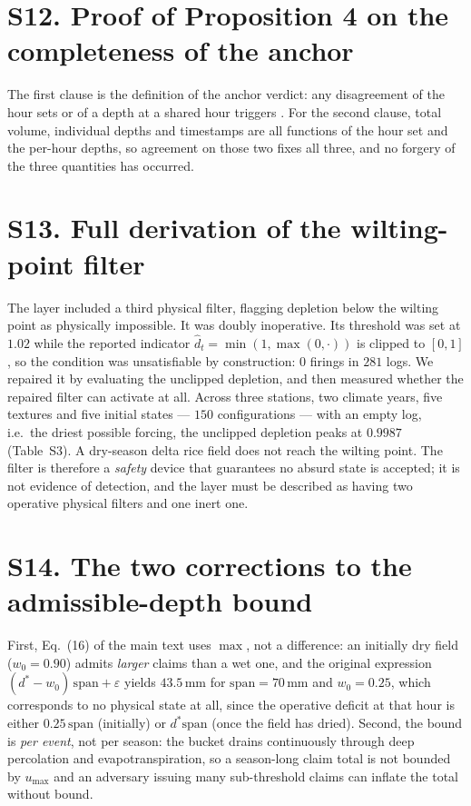 \section*{S12. Proof of Proposition 4 on the completeness of the anchor}

The first clause is the definition of the anchor verdict: any disagreement of
the hour sets or of a depth at a shared hour triggers . For the
second clause, total volume, individual depths and timestamps are all functions
of the hour set and the per-hour depths, so agreement on those two fixes all
three, and no forgery of the three quantities has occurred.

\section*{S13. Full derivation of the wilting-point filter}

The layer included a third physical filter, flagging depletion below the wilting point as physically impossible. It was doubly inoperative. Its
threshold was set at $1.02$ while the reported indicator
$\hat d_t=\min(1,\max(0,\cdot))$ is clipped to $[0,1]$, so the condition was
unsatisfiable by construction: $0$ firings in $281$ logs. We repaired it by
evaluating the unclipped depletion, and then measured whether the repaired filter
can activate at all. Across three stations, two climate years, five textures and
five initial states --- $150$ configurations --- with an empty log, i.e.\ the
driest possible forcing, the unclipped depletion peaks at $0.9987$
(Table~S3). A dry-season delta rice field does not reach the
wilting point. The filter is therefore a \emph{safety} device that guarantees no
absurd state is accepted; it is not evidence of detection, and the layer must be
described as having two operative physical filters and one inert one.

\section*{S14. The two corrections to the admissible-depth bound}

First, Eq.~(16) of the main text uses $\max$, not a difference: an initially
dry field ($w_0=0.90$) admits \emph{larger} claims than a wet one, and the
original expression $(d^{*}-w_0)\,\mathrm{span}+\varepsilon$
yields $43.5$\,mm for $\mathrm{span}=70$\,mm and $w_0=0.25$, which
corresponds to no physical state at all, since the operative deficit at that
hour is either $0.25\,\mathrm{span}$ (initially) or $d^{*}\mathrm{span}$
(once the field has dried). Second, the bound is \emph{per event}, not per
season: the bucket drains continuously through deep percolation and
evapotranspiration, so a season-long claim total is not bounded by $u_{\max}$
and an adversary issuing many sub-threshold claims can inflate the total
without bound.

